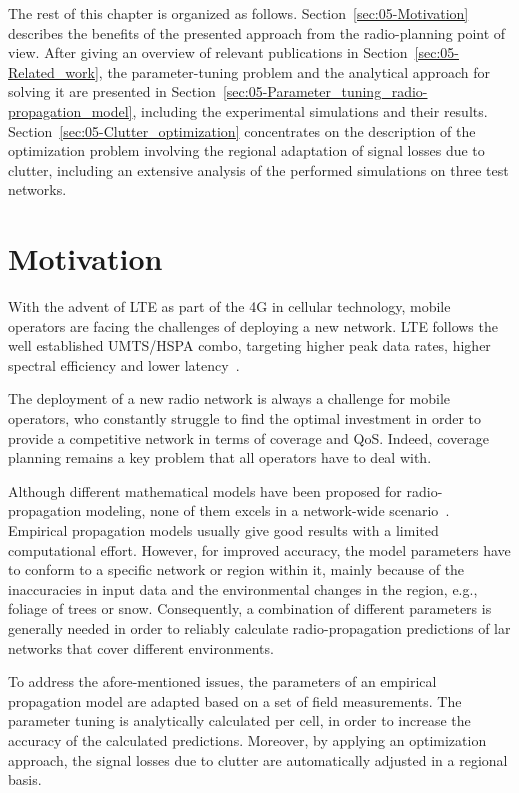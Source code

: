 The rest of this chapter is organized as follows. Section~\ref{sec:05-Motivation}
describes the benefits of the presented approach from the radio-planning
point of view. After giving an overview of relevant publications in
Section~\ref{sec:05-Related_work}, the parameter-tuning problem
and the analytical approach for solving it are presented in Section~\ref{sec:05-Parameter_tuning_radio-propagation_model},
including the experimental simulations and their results. Section~\ref{sec:05-Clutter_optimization}
concentrates on the description of the optimization problem involving
the regional adaptation of signal losses due to clutter, including
an extensive analysis of the performed simulations on three test networks.


\section{Motivation \label{sec:05-Motivation}}

With the advent of LTE as part of the 4G in cellular technology, mobile
operators are facing the challenges of deploying a new network. LTE
follows the well established UMTS/HSPA combo, targeting higher peak
data rates, higher spectral efficiency and lower latency~\cite{Song_Evolved_cellular_network_planning_and_optimization_for_UMTS_and_LTE:2010}. 

The deployment of a new radio network is always a challenge for mobile
operators, who constantly struggle to find the optimal investment
in order to provide a competitive network in terms of coverage and
QoS. Indeed, coverage planning remains a key problem that all operators
have to deal with.

Although different mathematical models have been proposed for radio-propagation
modeling, none of them excels in a network-wide scenario~\cite{Shabbir_Comparison_of_radio_propagation_models:2011}.
Empirical propagation models usually give good results with a limited
computational effort. However, for improved accuracy, the model parameters
have to conform to a specific network or region within it, mainly
because of the inaccuracies in input data and the environmental changes
in the region, e.g., foliage of trees or snow. Consequently, a combination
of different parameters is generally needed in order to reliably calculate
radio-propagation predictions of lar networks that cover different
environments.

To address the afore-mentioned issues, the parameters of an empirical
propagation model are adapted based on a set of field measurements.
The parameter tuning is analytically calculated per cell, in order
to increase the accuracy of the calculated predictions. Moreover,
by applying an optimization approach, the signal losses due to clutter
are automatically adjusted in a regional basis.

